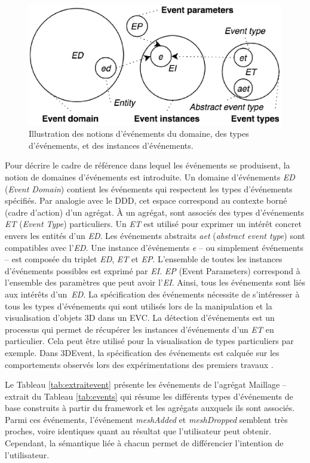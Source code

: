 \begin{figure}[ht]
	\centering
	\includegraphics[width=0.7\columnwidth]{eps/event4.eps}
	\caption{Illustration des notions d'événements du domaine, des types 
		d'événements, et des instances d'événements.}
	\label{fig:representation_event}
\end{figure} 

Pour décrire le cadre de référence dans lequel les événements se produisent, la 
notion de domaines d'événements est introduite. Un domaine d'événements 
\textit{ED} (\textit{Event Domain}) contient les événements qui respectent les types 
d'événements spécifiés. Par analogie avec le \gls{DDD}, cet 
espace correspond au contexte borné (cadre d'action) d'un agrégat. À un agrégat, 
sont associés des types d'événements \textit{ET} (\textit{Event Type}) particuliers. 
Un \textit{ET} est utilisé pour exprimer un intérêt concret envers les entités d'un 
\textit{ED}. 
Les événements abstraits \textit{aet} (\textit{abstract event type}) sont 
compatibles avec l'\textit{ED}. 
Une instance d'événements \textit{e} -- ou simplement 
événements -- est composée du triplet \textit{ED}, \textit{ET} et \textit{EP}. 
L'ensemble de toutes les instances d'événements possibles est exprimé par 
\textit{EI}. \textit{EP} (Event Parameters) correspond à l'ensemble des paramètres 
que peut avoir l'\textit{EI}. Ainsi, tous les événements sont liés aux intérêts 
d'un~\textit{ED}. La spécification des événements nécessite de 
s'intéresser à tous les types d'événements qui sont utilisés lors de la manipulation 
et la visualisation d'objets \gls{3D} dans un \gls{EVC}. La détection d'événements 
est un processus qui permet de récupérer les instances d'événements d'un 
\textit{ET} en particulier. Cela peut être utilisé pour la visualisation de types
particuliers par exemple. Dans 3DEvent, la spécification des événements est calquée 
sur les comportements observés lors des expérimentations des premiers travaux 
\cite{Desprat2015a, Desprat2015b}. 

Le Tableau \ref{tab:extraitevent}
présente les événements de l'agrégat Maillage -- extrait du Tableau 
\ref{tab:events} qui résume les 
différents types d'événements de base construits à partir du framework et les 
agrégats auxquels ils sont associés. Parmi ces événements, l'événement 
\textit{meshAdded} et \textit{meshDropped} semblent très proches, voire 
identiques quant au résultat que l'utilisateur peut obtenir. Cependant, la sémantique 
liée à chacun permet de différencier l'intention de l'utilisateur. 


